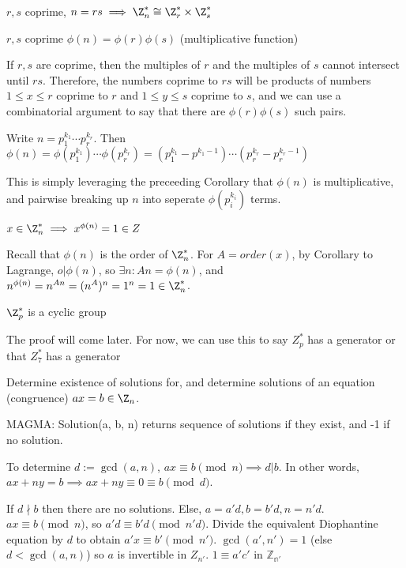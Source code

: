 \documentclass[10pt]{article}
\begin{document}
\begin{cor}
    $r, s$ coprime, $n = rs \implies \Z_n^* \cong \Z_r^* \times \Z_s^*$
\end{cor}

\begin{cor}
    $r, s$ coprime $\phi(n) = \phi(r)\phi(s)$ (multiplicative function)
\end{cor}

If $r, s$ are coprime, then the multiples of $r$ and the multiples of $s$ cannot intersect until $rs$. Therefore, the numbers coprime to $rs$ will be products of numbers $1 \leq x \leq r$ coprime to $r$ and $1 \leq y \leq s$ coprime to $s$, and we can use a combinatorial argument to say that there are $\phi(r)\phi(s)$ such pairs. 
\begin{cor}
    Write $n = p_1^{k_1} \cdots p_r^{k_r}$. Then $\phi(n) = \phi(p_1^{k_1}) \cdots \phi(p_r^{k_r}) = (p_1^{k_1} - p^{k_1 - 1})\cdots (p_r^{k_r} - p_r^{k_r - 1})$
\end{cor}

This is simply leveraging the preceeding Corollary that $\phi(n)$ is multiplicative, and pairwise breaking up $n$ into seperate $\phi(p_i^{k_i})$ terms. 

\begin{cor}
    $x\in \Z_n^* \implies x^{\phi(n)} = 1 \in Z$
\end{cor}

Recall that  $\phi(n)$ is the order of $\Z_n^*$. For $A = order(x)$, by Corollary to Lagrange, $ o| \phi(n)$, so $\exists n : An = \phi(n)$, and $n^{\phi(n)} = n^{An} = (n^A)^n = 1^n = 1 \in \Z_n^*$.

\begin{thm}
    $\Z_p^*$ is a cyclic group
\end{thm}

The proof will come later. 
For now, we can use this to say $Z_p^*$ has a generator or that $Z_7^*$ has a generator

\begin{exm*}
    Determine existence of solutions for, and determine solutions of an equation (congruence) $ax = b \in \Z_n$.
\end{exm*}
MAGMA: Solution(a, b, n) returns sequence of solutions if they exist, and -1 if no solution.

To determine $d := \gcd(a, n)$, $ax \equiv b\pmod{n} \implies d | b$. In other words, $ax + ny = b \implies ax + ny \equiv 0 \equiv b \pmod{d}$.


If $d \nmid b$ then there are no solutions. Else, $a = a'd, b = b'd, n = n'd$. $ax \equiv b \pmod{n}$, so $a'd \equiv b'd \pmod{n'd}$. Divide the equivalent Diophantine equation by $d$ to obtain $a'x \equiv b' \pmod{n'}$. $\gcd(a', n') = 1$ (else $d < \gcd(a, n)$) so $a$ is invertible in $Z_{n'}$. $1 \equiv a'c'$ in $\mathbb{Z_{n'}}$
\end{document}
